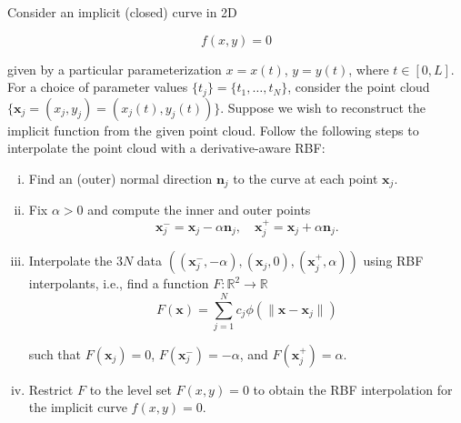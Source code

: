 Consider an implicit (closed) curve in 2D

$$
f(x, y) = 0
$$

given by a particular parameterization $x = x(t)$, $y = y(t)$, where $t \in [0, L]$. For a choice of parameter values
$\{t_j\} = \{t_1, \dots, t_N\}$, consider the point cloud \linebreak
$\{ \bm{x}_j = \left( x_j, y_j \right) = \left( x_j(t), y_j(t) \right) \}$. Suppose we wish to reconstruct the implicit 
function from the given point cloud. Follow the following steps to interpolate the point cloud with a derivative-aware 
RBF:


\begin{enumerate}[(i)]
  \item Find an (outer) normal direction $\bm{n}_j$ to the curve at each point $\bm{x}_j$.
  \item Fix $\alpha > 0$ and compute the inner and outer points
        $$
          \bm{x}_j^- = \bm{x}_j - \alpha \bm{n}_j, \quad \bm{x}_j^+ = \bm{x}_j + \alpha \bm{n}_j.
        $$
  \item Interpolate the $3N$ data $\left( (\bm{x}_j^-, -\alpha), (\bm{x}_j, 0), (\bm{x}_j^+, \alpha) \right)$ using RBF interpolants, i.e., find a function $F: \mathbb{R}^2 \to \mathbb{R}$
        $$
          F(\bm{x}) = \sum\limits_{j=1}^{N} c_j \phi \left( \lVert \bm{x} - \bm{x}_j \rVert \right)
        $$

        such that $F(\bm{x}_j) = 0$, $F(\bm{x}_j^-) = -\alpha$, and $F(\bm{x}_j^+) = \alpha$.
  \item Restrict $F$ to the level set $F(x, y) = 0$ to obtain the RBF interpolation for the implicit curve $f(x, y) = 0$.
\end{enumerate}

